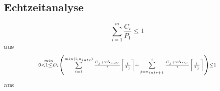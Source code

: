 \subsection{Echtzeitanalyse}
\label{sec:Echtzeitanalyse} 
\begin{equation}
	\scriptstyle 
		\sum \limits_{i=1}^m\frac{C_i}{P_1}\leq 1
\label{eq:scheduable1}
\end{equation}
aus \cite{9783827373427}
\begin{equation}
\scriptstyle 
	 \stackrel{min}{0 < 1 \leq D_i}\left(\sum \limits_{i=1}^{min(i,n_{intr})}\frac{C_j + 2\Delta_{intr}}{t}\left\lceil \frac{t}{T_j}\right\rceil+\\
	\sum \limits_{j=n_{intr+1}}^{i}\frac{C_j + 2\Delta_{thr}}{t}\left\lceil \frac{t}{T_j}\right\rceil\right)\leq 1
	\label{eq:scheduable2}
\end{equation}
aus \cite{RealTimePerformance}

